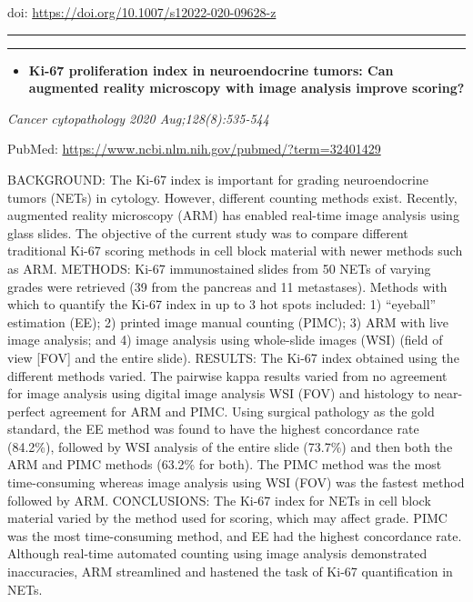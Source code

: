 \documentclass[
]{article}
\providecommand{\tightlist}{%
  \setlength{\itemsep}{0pt}\setlength{\parskip}{0pt}}
\begin{document}
doi: \url{https://doi.org/10.1007/s12022-020-09628-z}

\begin{center}\rule{0.5\linewidth}{0.5pt}\end{center}

\begin{center}\rule{0.5\linewidth}{0.5pt}\end{center}

\begin{itemize}
\tightlist
\item
  \textbf{Ki-67 proliferation index in neuroendocrine tumors: Can
  augmented reality microscopy with image analysis improve scoring?}
\end{itemize}

\emph{Cancer cytopathology 2020 Aug;128(8):535-544}

PubMed: \url{https://www.ncbi.nlm.nih.gov/pubmed/?term=32401429}

BACKGROUND: The Ki-67 index is important for grading neuroendocrine
tumors (NETs) in cytology. However, different counting methods exist.
Recently, augmented reality microscopy (ARM) has enabled real-time image
analysis using glass slides. The objective of the current study was to
compare different traditional Ki-67 scoring methods in cell block
material with newer methods such as ARM. METHODS: Ki-67 immunostained
slides from 50 NETs of varying grades were retrieved (39 from the
pancreas and 11 metastases). Methods with which to quantify the Ki-67
index in up to 3 hot spots included: 1) ``eyeball'' estimation (EE); 2)
printed image manual counting (PIMC); 3) ARM with live image analysis;
and 4) image analysis using whole-slide images (WSI) (field of view
{[}FOV{]} and the entire slide). RESULTS: The Ki-67 index obtained using
the different methods varied. The pairwise kappa results varied from no
agreement for image analysis using digital image analysis WSI (FOV) and
histology to near-perfect agreement for ARM and PIMC. Using surgical
pathology as the gold standard, the EE method was found to have the
highest concordance rate (84.2\%), followed by WSI analysis of the
entire slide (73.7\%) and then both the ARM and PIMC methods (63.2\% for
both). The PIMC method was the most time-consuming whereas image
analysis using WSI (FOV) was the fastest method followed by ARM.
CONCLUSIONS: The Ki-67 index for NETs in cell block material varied by
the method used for scoring, which may affect grade. PIMC was the most
time-consuming method, and EE had the highest concordance rate. Although
real-time automated counting using image analysis demonstrated
inaccuracies, ARM streamlined and hastened the task of Ki-67
quantification in NETs.
\end{document}

